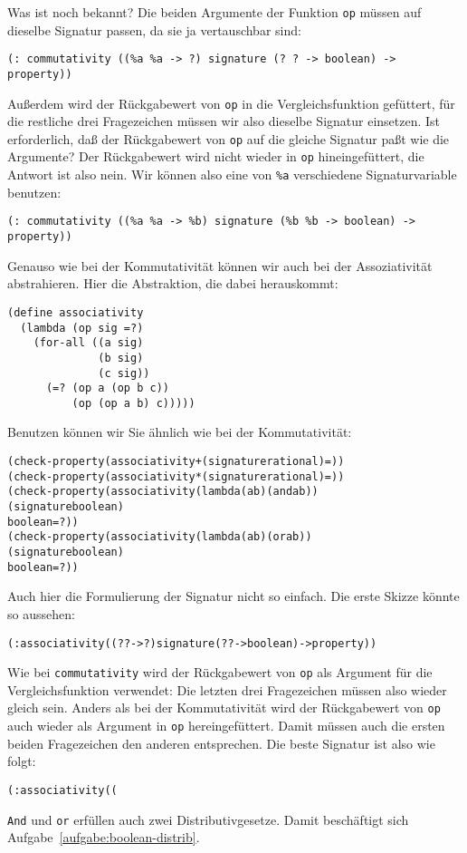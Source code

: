 Was ist noch bekannt?  Die beiden Argumente der Funktion \texttt{op}
müssen auf dieselbe Signatur passen, da sie ja vertauschbar sind:
%
\begin{verbatim}
(: commutativity ((%a %a -> ?) signature (? ? -> boolean) -> property))
\end{verbatim}
%
Außerdem wird der Rückgabewert von \texttt{op} in die
Vergleichsfunktion gefüttert, für die restliche drei Fragezeichen
müssen wir also dieselbe Signatur einsetzen.  Ist erforderlich, daß
der Rückgabewert von \texttt{op} auf die gleiche Signatur paßt wie die
Argumente?  Der Rückgabewert wird nicht wieder in \texttt{op}
hineingefüttert, die Antwort ist also nein.  Wir können also eine
von \verb|%a| verschiedene Signaturvariable benutzen:
%
\begin{verbatim}
(: commutativity ((%a %a -> %b) signature (%b %b -> boolean) -> property))
\end{verbatim}
%
Genauso wie bei der Kommutativität können wir auch bei der
Assoziativität abstrahieren.  Hier die Abstraktion, die dabei
herauskommt:
%
\begin{verbatim}
(define associativity
  (lambda (op sig =?)
    (for-all ((a sig)
              (b sig)
              (c sig))
      (=? (op a (op b c))
          (op (op a b) c)))))
\end{verbatim}
%
Benutzen können wir Sie ähnlich wie bei der Kommutativität:
%
\begin{alltt}
(check-property (associativity + (signature rational) =))
(check-property (associativity * (signature rational) =))
(check-property (associativity (lambda (a b) (and a b))
                               (signature boolean)
                               boolean=?))
(check-property (associativity (lambda (a b) (or a b))
                               (signature boolean)
                               boolean=?))
\end{alltt}
%
Auch hier die Formulierung der Signatur nicht so einfach.  Die erste
Skizze könnte so aussehen:
%
\begin{alltt}
(: associativity ((? ? -> ?) signature (? ? -> boolean) -> property))
\end{alltt}
%
Wie bei \texttt{commutativity} wird der Rückgabewert von \texttt{op}
als Argument für die Vergleichsfunktion verwendet: Die letzten drei
Fragezeichen müssen also wieder gleich sein.  Anders als bei der
Kommutativität wird der Rückgabewert von \texttt{op} auch wieder als
Argument in \texttt{op} hereingefüttert.  Damit müssen auch die ersten
beiden Fragezeichen den anderen entsprechen.  Die beste Signatur ist
also wie folgt:
%
\begin{alltt}
(: associativity ((%a %a -> %a) signature (%a %a -> boolean) -> property))
\end{alltt}
%
\texttt{And} und
\texttt{or} erfüllen auch zwei Distributivgesetze.  Damit beschäftigt
sich Aufgabe~\ref{aufgabe:boolean-distrib}.

